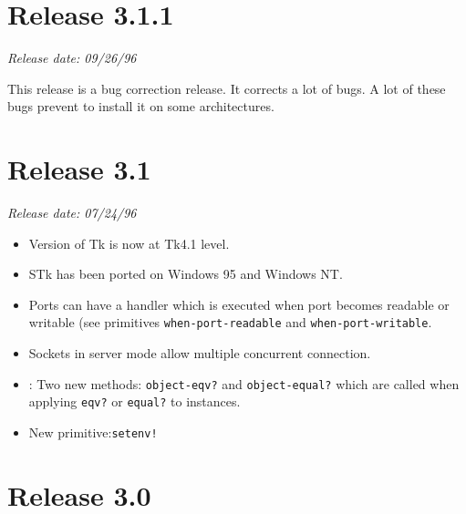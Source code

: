 \section*{Release 3.1.1}

\small{\emph{Release date: 09/26/96}}

This release is a bug correction release. It corrects a lot of bugs.
A lot of these bugs prevent to install it on some architectures.


\section*{Release 3.1}

\small{\emph{Release date: 07/24/96}}

\begin{itemize}
\item Version of Tk is now at Tk4.1 level.
\item STk has been ported on Windows 95 and Windows NT. 
\item Ports can have a handler which is executed when port becomes
  readable or writable (see primitives \texttt{when-port-readable} and
  \texttt{when-port-writable}.
\item Sockets in server mode allow multiple concurrent connection.
\item \stklos{}: Two new methods: \texttt{object-eqv?} and
  \texttt{object-equal?} which are called when applying \texttt{eqv?} 
  or \texttt{equal?} to instances.
\item New primitive:\texttt{setenv!}
  
\end{itemize}
\section*{Release 3.0} 


